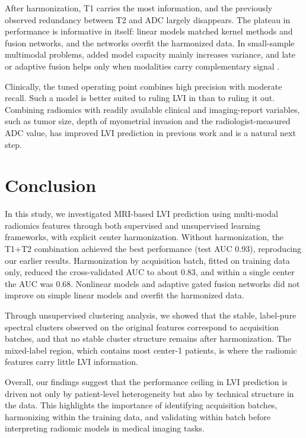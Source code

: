 \documentclass[conference]{IEEEtran}
\begin{document}
After harmonization, T1 carries the most information, and the previously observed redundancy between T2 and ADC largely disappears. The plateau in performance is informative in itself: linear models matched kernel methods and fusion networks, and the networks overfit the harmonized data. In small-sample multimodal problems, added model capacity mainly increases variance, and late or adaptive fusion helps only when modalities carry complementary signal \cite{pereira2023comparative,baltrusaitis2019multimodal}.

Clinically, the tuned operating point combines high precision with moderate recall. Such a model is better suited to ruling LVI in than to ruling it out. Combining radiomics with readily available clinical and imaging-report variables, such as tumor size, depth of myometrial invasion and the radiologist-measured ADC value, has improved LVI prediction in previous work \cite{ma2025predictive} and is a natural next step.

\section{Conclusion}

In this study, we investigated MRI-based LVI prediction using multi-modal radiomics features through both supervised and unsupervised learning frameworks, with explicit center harmonization. Without harmonization, the T1+T2 combination achieved the best performance (test AUC 0.93), reproducing our earlier results. Harmonization by acquisition batch, fitted on training data only, reduced the cross-validated AUC to about 0.83, and within a single center the AUC was 0.68. Nonlinear models and adaptive gated fusion networks did not improve on simple linear models and overfit the harmonized data.

Through unsupervised clustering analysis, we showed that the stable, label-pure spectral clusters observed on the original features correspond to acquisition batches, and that no stable cluster structure remains after harmonization. The mixed-label region, which contains most center-1 patients, is where the radiomic features carry little LVI information.

Overall, our findings suggest that the performance ceiling in LVI prediction is driven not only by patient-level heterogeneity but also by technical structure in the data. This highlights the importance of identifying acquisition batches, harmonizing within the training data, and validating within batch before interpreting radiomic models in medical imaging tasks.
\end{document}
